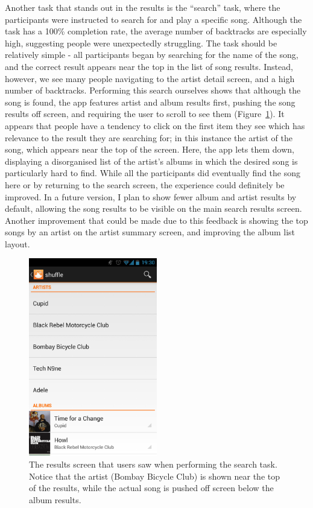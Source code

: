 Another task that stands out in the results is the ``search'' task, where the participants
were instructed to search for and play a specific song. Although the task has a 100\% completion
rate, the average number of backtracks are especially high, suggesting people
were unexpectedly struggling. The task should be relatively simple - all participants
began by searching for the name of the song, and the correct result appears near the top
in the list of song results. Instead, however, we see many people navigating to the artist
detail screen, and a high number of backtracks. Performing this search ourselves shows that
although the song is found, the app features artist and album results first, pushing the
song results off screen, and requiring the user to scroll to see them (Figure~\ref{fig:search-results}). It appears that people
have a tendency to click on the first item they see which has relevance to the result they
are searching for; in this instance the artist of the song, which appears near the top
of the screen. Here, the app lets them down, displaying a disorganised list of the artist's
albums in which the desired song is particularly hard to find. While all the participants did eventually
find the song here or by returning to the search screen, the experience could definitely be
improved. In a future version, I plan to show fewer album and artist results by default,
allowing the song results to be visible on the main search results screen. Another improvement
that could be made due to this feedback is showing the top songs by an artist on the artist
summary screen, and improving the album list layout.

\begin{figure}[h]
  \centering 
  \includegraphics[width=0.5\textwidth]{images/search-results}
  \caption{The results screen that users saw when performing the search task.
           Notice that the artist (Bombay Bicycle Club) is shown near the top of the
           results, while the actual song is pushed off screen below the album
           results.}
  \label{fig:search-results}
\end{figure}

